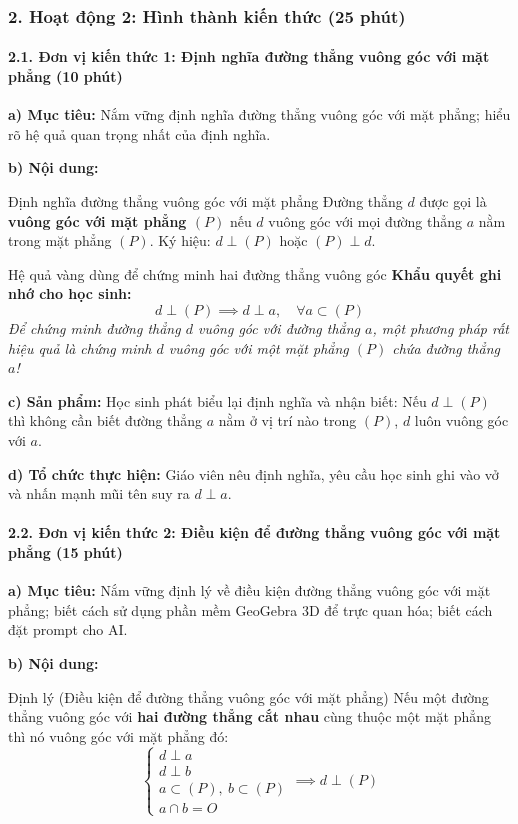 \documentclass[12pt, a4paper]{article}
\begin{document}
\subsubsection*{2. Hoạt động 2: Hình thành kiến thức (25 phút)}

\paragraph{2.1. Đơn vị kiến thức 1: Định nghĩa đường thẳng vuông góc với mặt phẳng (10 phút)}

\noindent \textbf{a) Mục tiêu:}
Nắm vững định nghĩa đường thẳng vuông góc với mặt phẳng; hiểu rõ hệ quả quan trọng nhất của định nghĩa.

\noindent \textbf{b) Nội dung:}
\begin{pedabox}{Định nghĩa đường thẳng vuông góc với mặt phẳng}
Đường thẳng $d$ được gọi là \textbf{vuông góc với mặt phẳng $(P)$} nếu $d$ vuông góc với mọi đường thẳng $a$ nằm trong mặt phẳng $(P)$.
Ký hiệu: $d \perp (P)$ hoặc $(P) \perp d$.
\end{pedabox}

\begin{scaffoldbox}{Hệ quả vàng dùng để chứng minh hai đường thẳng vuông góc}
\textbf{Khẩu quyết ghi nhớ cho học sinh:}
$$d \perp (P) \implies d \perp a, \quad \forall a \subset (P)$$
\textit{Để chứng minh đường thẳng $d$ vuông góc với đường thẳng $a$, một phương pháp rất hiệu quả là chứng minh $d$ vuông góc với một mặt phẳng $(P)$ chứa đường thẳng $a$!}
\end{scaffoldbox}

\noindent \textbf{c) Sản phẩm:}
Học sinh phát biểu lại định nghĩa và nhận biết: Nếu $d \perp (P)$ thì không cần biết đường thẳng $a$ nằm ở vị trí nào trong $(P)$, $d$ luôn vuông góc với $a$.

\noindent \textbf{d) Tổ chức thực hiện:}
Giáo viên nêu định nghĩa, yêu cầu học sinh ghi vào vở và nhấn mạnh mũi tên suy ra $d \perp a$.

\paragraph{2.2. Đơn vị kiến thức 2: Điều kiện để đường thẳng vuông góc với mặt phẳng (15 phút)}

\noindent \textbf{a) Mục tiêu:}
Nắm vững định lý về điều kiện đường thẳng vuông góc với mặt phẳng; biết cách sử dụng phần mềm GeoGebra 3D để trực quan hóa; biết cách đặt prompt cho AI.

\noindent \textbf{b) Nội dung:}
\begin{pedabox}{Định lý (Điều kiện để đường thẳng vuông góc với mặt phẳng)}
Nếu một đường thẳng vuông góc với \textbf{hai đường thẳng cắt nhau} cùng thuộc một mặt phẳng thì nó vuông góc với mặt phẳng đó:
$$\begin{cases} d \perp a \\ d \perp b \\ a \subset (P), \ b \subset (P) \\ a \cap b = O \end{cases} \implies d \perp (P)$$
\end{pedabox}
\end{document}
